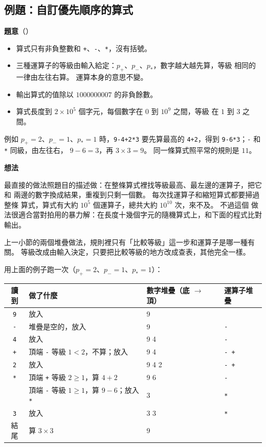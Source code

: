 \subsection{例題：自訂優先順序的算式}
\label{sec:ex-expr}

\textbf{題意}（）

\begin{itemize}
\item 算式只有非負整數和 \texttt{+}、\texttt{-}、\texttt{*}，沒有括號。
\item 三種運算子的等級由輸入給定：$p_+$、$p_-$、$p_*$，數字越大越先算，等級
相同的一律由左往右算。 運算本身的意思不變。
\item 輸出算式的值除以 $1000000007$ 的非負餘數。
\item 算式長度到 $2 \times 10^5$ 個字元，每個數字在 $0$ 到 $10^9$ 之間，等級
在 $1$ 到 $3$ 之間。
\end{itemize}

例如 $p_+ = 2$、$p_- = 1$、$p_* = 1$ 時，\texttt{9-4+2*3} 要先算最高的
\texttt{4+2}，得到 \texttt{9-6*3}；\texttt{-} 和 \texttt{*} 同級，由左往右，
$9 - 6 = 3$，再 $3 \times 3 = 9$。 同一條算式照平常的規則是 $11$。

\textbf{想法}

最直接的做法照題目的描述做：在整條算式裡找等級最高、最左邊的運算子，把它和
兩邊的數字換成結果，重複到只剩一個數。 每次找運算子和縮短算式都要掃過整條
算式，算式有大約 $10^5$ 個運算子，總共大約 $10^{10}$ 次，來不及。 不過這個
做法很適合當對拍用的暴力解：在長度十幾個字元的隨機算式上，和下面的程式比對
輸出。

上一小節的兩個堆疊做法，規則裡只有「比較等級」這一步和運算子是哪一種有關。
等級改成由輸入決定，只要把比較等級的地方改成查表，其他完全一樣。

用上面的例子跑一次（$p_+ = 2$、$p_- = 1$、$p_* = 1$）：

\begin{center}
\begin{tabular}{clll}
\toprule
讀到 & 做了什麼 & 數字堆疊（底 $\to$ 頂） & 運算子堆疊 \\
\midrule
\texttt{9} & 放入 & 9 & \\
\texttt{-} & 堆疊是空的，放入 & 9 & \texttt{-} \\
\texttt{4} & 放入 & 9 4 & \texttt{-} \\
\texttt{+} & 頂端 \texttt{-} 等級 $1 < 2$，不算；放入 & 9 4 & \texttt{- +} \\
\texttt{2} & 放入 & 9 4 2 & \texttt{- +} \\
\texttt{*} & 頂端 \texttt{+} 等級 $2 \ge 1$，算 $4+2$ & 9 6 & \texttt{-} \\
 & 頂端 \texttt{-} 等級 $1 \ge 1$，算 $9-6$；放入 \texttt{*} & 3 & \texttt{*} \\
\texttt{3} & 放入 & 3 3 & \texttt{*} \\
結尾 & 算 $3 \times 3$ & 9 & \\
\bottomrule
\end{tabular}
\end{center}

